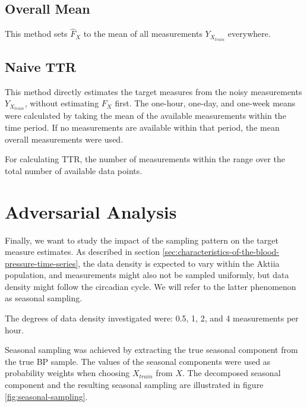 \subsection{Overall Mean}
This method sets $\hat{F}_X$ to the mean of all measurements
$Y_{X_{train}}$ everywhere.


\subsection{Naive TTR}
This method directly estimates the target measures
from the noisy measurements $Y_{X_{train}}$, without estimating $F_X$
first.
The one-hour, one-day, and one-week means were calculated by
taking the mean of the available measurements within the time period.
If no measurements are available within that period, the mean
overall measurements were used.

For calculating TTR, the number of measurements within the range over
the total number of available data points.


\section{Adversarial Analysis}\label{sec:adversarial-analysis}

Finally, we want to study the impact of the sampling pattern on the
target measure estimates.
As described in section \ref{sec:characteristics-of-the-blood-pressure-time-series},
the data density is expected to vary within the Aktiia population, and
measurements might
also not be sampled uniformly, but data density might follow the circadian cycle.
We will refer to the latter phenomenon as seasonal sampling.

The degrees of data density investigated were: 0.5, 1, 2, and 4
measurements per hour.

Seasonal sampling was achieved by extracting the true seasonal component from
the true BP sample. The values of the seasonal components were used
as probability weights when choosing $X_{train}$ from $X$. The decomposed
seasonal component and the resulting seasonal sampling are illustrated
in figure \ref{fig:seasonal-sampling}.


